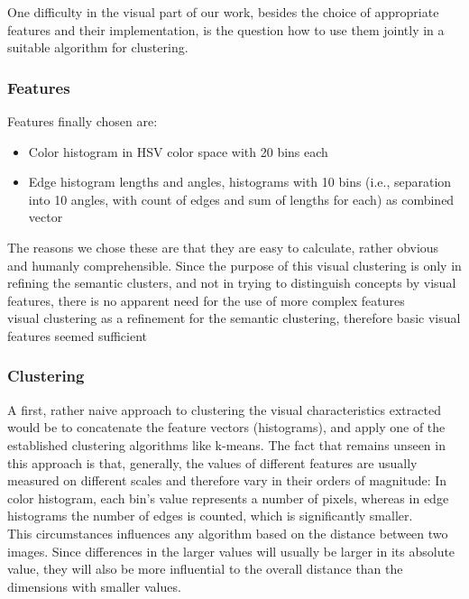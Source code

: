One difficulty in the visual part of our work, besides the choice of appropriate features and their implementation, is the question how to use them jointly in a suitable algorithm for clustering. 

\subsubsection{Features}
Features finally chosen are:
\begin{itemize}
\item{Color histogram} in HSV color space with 20 bins each
\item{Edge histogram} lengths and angles, histograms with 10 bins (i.e., separation into 10 angles, with count of edges and sum of lengths for each) as combined vector 
\end{itemize}
The reasons we chose these are that they are easy to calculate, rather obvious and humanly comprehensible. Since the purpose of this visual clustering is only in refining the semantic clusters, and not in trying to distinguish concepts by visual features, there is no apparent need for the use of more complex features \\
visual clustering as a refinement for the semantic clustering, therefore basic visual features seemed sufficient 


\subsubsection{Clustering}
A first, rather naive approach to clustering the visual characteristics extracted would be to concatenate the feature vectors (histograms), and apply one of the established clustering algorithms like k-means.  The fact that remains unseen in this approach is that, generally, the values of different features are usually measured on different scales and therefore vary in their orders of magnitude: In color histogram, each bin's value represents a number of pixels, whereas in edge histograms the number of edges is counted, which is significantly smaller. \\
This circumstances influences any algorithm based on the distance between two images. Since differences in the larger values will usually be larger in its absolute value, they will also be more influential to the overall distance than the dimensions with smaller values.

